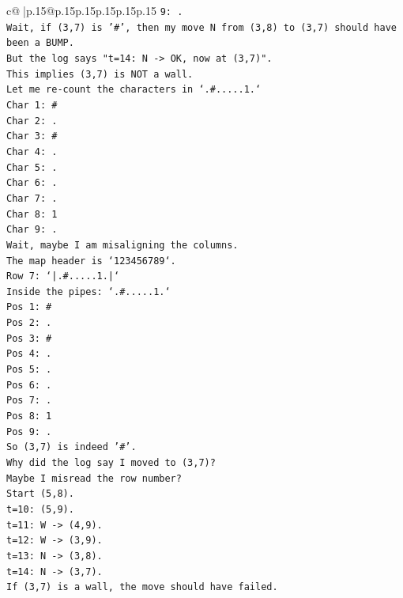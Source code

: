 \documentclass{article}
\begin{document}
{\begin{supertabular}{c@{$\;$}|p{.15\linewidth}@{}p{.15\linewidth}p{.15\linewidth}p{.15\linewidth}p{.15\linewidth}p{.15\linewidth}}
{{{\texttt{9: .} \\
\texttt{Wait, if (3,7) is '\#', then my move N from (3,8) to (3,7) should have been a BUMP.} \\
\texttt{But the log says "t=14: N {-}> OK, now at (3,7)".} \\
\texttt{This implies (3,7) is NOT a wall.} \\
\texttt{Let me re{-}count the characters in `.\#.....1.`} \\
\texttt{Char 1: \#} \\
\texttt{Char 2: .} \\
\texttt{Char 3: \#} \\
\texttt{Char 4: .} \\
\texttt{Char 5: .} \\
\texttt{Char 6: .} \\
\texttt{Char 7: .} \\
\texttt{Char 8: 1} \\
\texttt{Char 9: .} \\
\texttt{Wait, maybe I am misaligning the columns.} \\
\texttt{The map header is `123456789`.} \\
\texttt{Row 7: `|.\#.....1.|`} \\
\texttt{Inside the pipes: `.\#.....1.`} \\
\texttt{Pos 1: \#} \\
\texttt{Pos 2: .} \\
\texttt{Pos 3: \#} \\
\texttt{Pos 4: .} \\
\texttt{Pos 5: .} \\
\texttt{Pos 6: .} \\
\texttt{Pos 7: .} \\
\texttt{Pos 8: 1} \\
\texttt{Pos 9: .} \\
\texttt{So (3,7) is indeed '\#'.} \\
\texttt{Why did the log say I moved to (3,7)?} \\
\texttt{Maybe I misread the row number?} \\
\texttt{Start (5,8).} \\
\texttt{t=10: (5,9).} \\
\texttt{t=11: W {-}> (4,9).} \\
\texttt{t=12: W {-}> (3,9).} \\
\texttt{t=13: N {-}> (3,8).} \\
\texttt{t=14: N {-}> (3,7).} \\
\texttt{If (3,7) is a wall, the move should have failed.} \\
}}}
\end{supertabular}}
\end{document}
